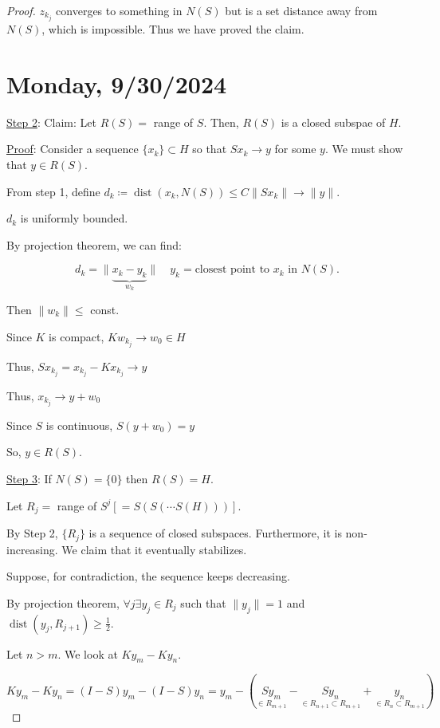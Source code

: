 \documentclass{article}
\theoremstyle{definition}
\begin{document}
\begin{proof}
    \(z_{k_j}\) converges to something in \(N(S)\) but is a set distance away from \(N(S)\), which is impossible. Thus we have proved the claim.

\section*{Monday, 9/30/2024}

\underline{Step 2}: Claim: Let \(R(S) = \) range of \(S\). Then, \(R(S)\) is a closed subspae of \(H\).

\underline{Proof}: Consider a sequence \(\{ x_k \}\subset H\) so that \(S x_k \to y\) for some \(y\). We must show that \(y\in R(S)\).

From step 1, define \(d_k \coloneqq \operatorname{dist}(x_k, N(S)) \leq C \lVert S x_k \rVert \to \lVert y \rVert \).

\(d_k\) is uniformly bounded.

By projection theorem, we can find:

\[
    d_k = \lVert\underbrace{x_k - y_k}_{w_k} \rVert \quad y_k = \text{closest point to $x_k$ in $N(S)$}.
\]

Then \(\lVert w_k \rVert \leq \) const.

Since \(K\) is compact, \(Kw_{k_j} \to w_0\in H\) 

Thus, \(Sx_{k_j} = x_{k_j} -K x_{k_j} \to y\) 

Thus, \(x_{k_j} \to y + w_0\) 

Since \(S\) is continuous, \(S(y+w_0) = y\) 

So, \(y\in R(S)\). 

\underline{Step 3}: If \(N(S) = \{ 0 \}\) then \(R(S) = H\).

Let \(R_j =\) range of \(S^j [= S(S(\cdots S(H)))]\).

By Step 2, \(\{ R_j \} \) is a sequence of closed subspaces. Furthermore, it is non-increasing. We claim that it eventually stabilizes.

Suppose, for contradiction, the sequence keeps decreasing.

By projection theorem, \(\forall j \exists y_j\in R_j\) such that \(\lVert y_j \rVert = 1\) and \(\operatorname{dis t} (y_j, R_{j+1}) \geq \frac{1}{2}\).

Let \(n > m\). We look at \(Ky_m - Ky_n\).

\[
    K y_m - K y_n = (I-S)y_m - (I-S)y_n = y_m - (\underset{\in R_{m+1}}{S y_m} - \underset{\in R_{n+1} \subset R_{m+1}}{S y_n} + \underset{\in R_n \subset R_{m+1}}{y_n})
\]


\end{proof}
\end{document}
